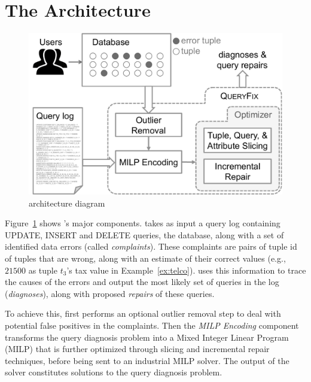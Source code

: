\section{The {\large\textbf{\sys}} Architecture}

\begin{figure}[h]
    \centering
        \includegraphics[scale=0.3]{figures/architecture}
    \caption{\sys architecture diagram}
    \label{fig:architecture}
\end{figure}


Figure~\ref{fig:architecture} shows \sys's major components.  \sys takes as input 
a query log containing UPDATE, INSERT and DELETE queries, the database, along with a
set of identified data errors (called {\it complaints}).  These complaints are pairs
of tuple id of tuples that are wrong, along with an estimate of their correct values 
(e.g., $21500$ as tuple $t_3$'s tax value in Example~\ref{ex:telco}).
\sys uses this information to trace the causes of the errors and output the most likely set of 
queries in the log ({\it diagnoses}), along with proposed {\it repairs} of these queries.

To achieve this, \sys first performs an optional outlier removal step to deal with potential
false positives in the complaints.  Then the {\it MILP Encoding} component transforms the
query diagnosis problem into a Mixed Integer Linear Program (MILP) that is further optimized
through slicing and incremental repair techniques, before being sent
to an industrial MILP solver.  The output of the solver constitutes solutions to the query diagnosis
problem.
